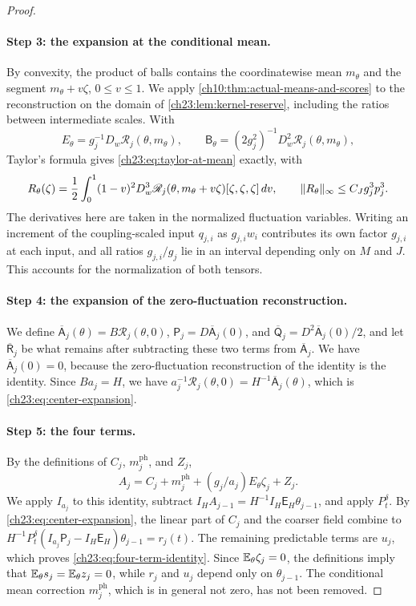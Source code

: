 \begin{proof}
\paragraph{Step 3: the expansion at the conditional mean.}
By convexity, the product of balls contains the coordinatewise mean $m_\theta$ and the segment $m_\theta+v\zeta$, $0\le v\le1$. We apply \cref{ch10:thm:actual-means-and-scores} to the reconstruction on the domain of \cref{ch23:lem:kernel-reserve}, including the ratios between intermediate scales. With
\[
 E_\theta=g_j^{-1}D_w\mathscr R_j(\theta,m_\theta),\qquad
 \mathsf B_\theta=(2g_j^2)^{-1}D_w^2\mathscr R_j(\theta,m_\theta),
\]
Taylor's formula gives \eqref{ch23:eq:taylor-at-mean} exactly, with
\begin{equation}\label{ch23:eq:taylor-remainder}
 R_\theta(\zeta)=\frac12\int_0^1(1-v)^2D_w^3\mathscr R_j(\theta,m_\theta+v\zeta)[\zeta,\zeta,\zeta]\,dv,
 \qquad \lVert R_\theta\rVert_\infty\le C_Jg_j^3p_j^3.
\end{equation}
The derivatives here are taken in the normalized fluctuation variables. Writing an increment of the coupling-scaled input $q_{j,i}$ as $g_{j,i}w_i$ contributes its own factor $g_{j,i}$ at each input, and all ratios $g_{j,i}/g_j$ lie in an interval depending only on $M$ and $J$. This accounts for the normalization of both tensors.

\paragraph{Step 4: the expansion of the zero-fluctuation reconstruction.}
We define $\overline{\mathsf A}_j(\theta)=B\mathscr R_j(\theta,0)$, $\mathsf P_j=D\overline{\mathsf A}_j(0)$, and $\overline{\mathsf Q}_j=D^2\overline{\mathsf A}_j(0)/2$, and let $\overline{\mathsf R}_j$ be what remains after subtracting these two terms from $\overline{\mathsf A}_j$. We have $\overline{\mathsf A}_j(0)=0$, because the zero-fluctuation reconstruction of the identity is the identity. Since $Ba_j=H$, we have $a_j^{-1}\mathscr R_j(\theta,0)=H^{-1}\overline{\mathsf A}_j(\theta)$, which is \eqref{ch23:eq:center-expansion}.

\paragraph{Step 5: the four terms.}
By the definitions of $C_j$, $m_j^{\mathrm{ph}}$, and $Z_j$,
\[
 A_j=C_j+m_j^{\mathrm{ph}}+(g_j/a_j)E_\theta\zeta_j+Z_j.
\]
We apply $I_{a_j}$ to this identity, subtract $I_HA_{j-1}=H^{-1}I_H\mathsf E_H\theta_{j-1}$, and apply $P_t^\delta$. By \eqref{ch23:eq:center-expansion}, the linear part of $C_j$ and the coarser field combine to $H^{-1}P_t^\delta(I_{a_j}\mathsf P_j-I_H\mathsf E_H)\theta_{j-1}=r_j(t)$. The remaining predictable terms are $u_j$, which proves \eqref{ch23:eq:four-term-identity}. Since $\mathbb E_\theta\zeta_j=0$, the definitions imply that $\mathbb E_\theta s_j=\mathbb E_\theta z_j=0$, while $r_j$ and $u_j$ depend only on $\theta_{j-1}$. The conditional mean correction $m_j^{\mathrm{ph}}$, which is in general not zero, has not been removed.


\end{proof}
